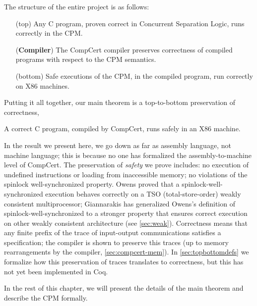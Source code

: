 The structure of the entire project is as follows:


\begin{enumerate}[leftmargin=\widthof{(Compiler)}+\labelsep, rightmargin=2cm] %
\item[(top)] Any C program, proven correct in Concurrent Separation Logic, runs correctly in the CPM. 
\item[(\textbf{Compiler})] The CompCert compiler preserves correctness of compiled programs with respect to the CPM semantics. 
\item[(bottom)] Safe executions of the CPM, in the compiled program, run correctly on X86 machines. 
\end{enumerate}

Putting it all together, our main theorem is a top-to-bottom preservation of correctness,
\begin{theorem}\label{mainthm}
A correct C program, compiled by CompCert, runs safely in an X86 machine.
\end{theorem}

In the result we present here, we go down as far as assembly language, not machine language; this is because no one has formalized the assembly-to-machine level of CompCert. The preservation of \emph{safety} we prove includes: no execution of undefined instructions or loading from inaccessible memory; no violations of the spinlock well-synchronized property. Owens \cite{owens10:ecoop} proved that a spinlock-well-synchronized execution behaves correctly on a TSO (total-store-order) weakly consistent multiprocessor; Giannarakis has generalized Owens's definition of spinlock-well-synchronized to a stronger property that ensures correct execution on other weakly consistent architecture (see \autoref{sec:weak}). Correctness means that any finite prefix of the trace of input-output communications satisfies a specification; the compiler is shown to preserve this traces (up to memory rearrangements by the compiler, \autoref{sec:compcert-mem}). In \autoref{sec:topbottomdefs} we formalize how this preservation of traces translates to correctness, but this has not yet been implemented in Coq.

In the rest of this chapter, we will present the details of the main theorem and describe the CPM formally.  



%
